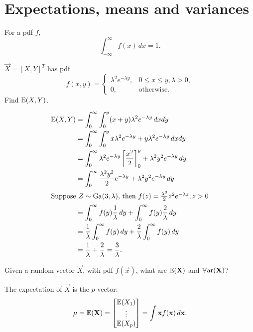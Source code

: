 \documentclass[10pt, a4paper]{article}
\begin{document}
\newpage

\section{Expectations,
means and variances}

\begin{definition}
    For a pdf $f$,
    \[
    \int_{-\infty}^{\infty}f(x)\,dx = 1.
    \]
\end{definition}


\begin{example}
    $\vec{X} = [X, Y] ^ T$ has pdf
    \[
    f(x, y) = \begin{cases}
        \lambda ^ 2e ^ {-\lambda y}, &0 \leq x \leq y, \lambda > 0, \\
        0, &\text{otherwise}.
    \end{cases}
    \]
    Find $\mathbb{E}(X, Y)$.

    \begin{solution}
        \begin{align*}
            \mathbb{E}(X, Y) &= \int_{0}^{\infty}\int_{0}^{y}(x + y)\lambda ^ 2e ^ {-\lambda y}\,dxdy \\
            &= \int_{0}^{\infty}\int_{0}^{y}x\lambda ^ 2e ^ {-\lambda y} + y\lambda ^ 2e ^ {-\lambda y}\,dxdy \\
            &= \int_{0}^{\infty}\lambda ^ 2e ^ {-\lambda y}\left[\frac{x ^ 2}{2}\right]_{0}^{y} + \lambda ^ 2y ^ 2e ^ {-\lambda y}\,dy \\
            &= \int_{0}^{\infty}\frac{\lambda ^ 2y ^ 2}{2}e ^ {-\lambda y} + \lambda ^ 2y ^ 2e ^ {-\lambda y}\,dy \\
            \intertext{Suppose $Z \sim \mathrm{Ga}(3, \lambda)$,
            then $f(z) = \frac{\lambda ^ 3}{2}z ^ 2e ^ {-\lambda z}, z > 0$}
            &= \int_{0}^{\infty}f(y)\frac{1}{\lambda}\,dy + \int_{0}^{\infty}f(y)\frac{2}{\lambda}\,dy \\
            &= \frac{1}{\lambda}\int_{0}^{\infty}f(y)\,dy + \frac{2}{\lambda}\int_{0}^{\infty}f(y)\,dy \\
            &= \frac{1}{\lambda} + \frac{2}{\lambda} = \frac{3}{\lambda}.
        \end{align*}
    \end{solution}
\end{example}

Given a random vector $\vec{X}$,
with pdf $f(\vec{x})$,
what are $\mathbb{E}(\mathbf{X})$ and $\mathbb{V}\mathrm{ar}(\mathbf{X})$?

\begin{definition}
    The expectation of $\vec{X}$ is the $p$-vector:
    \[
    \mathbf{\mu} = \mathbb{E}(\mathbf{X}) = \begin{bmatrix}
        \mathbb{E}(X_1) \\
        \vdots \\
        \mathbb{E}(X_p)
    \end{bmatrix} = \int\mathbf{x}f(\mathbf{x})\,d\mathbf{x}.
    \]
\end{definition}
\end{document}
